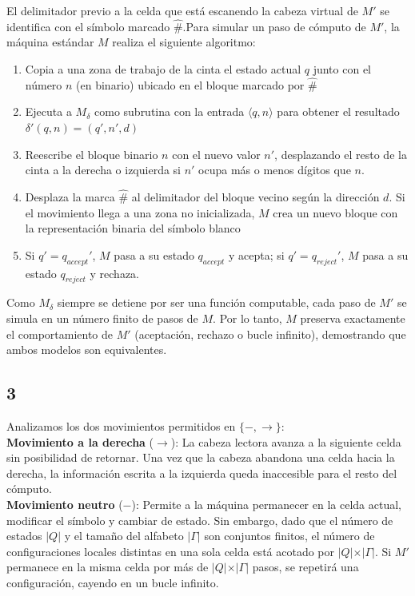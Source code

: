 El delimitador previo a la celda que está escanendo la cabeza virtual de $M'$ se identifica con el símbolo marcado $\hat{\#}$.Para simular un paso de cómputo de $M'$, la máquina estándar $M$ realiza el siguiente algoritmo:

\begin{enumerate}
\item Copia a una zona de trabajo de la cinta el estado actual $q$ junto con el número $n$ (en binario) ubicado en el bloque marcado por $\hat{\#}$
\item Ejecuta a $M_\delta$ como subrutina con la entrada $\langle q, n \rangle$ para obtener el resultado $\delta'(q, n) = (q', n', d)$
\item Reescribe el bloque binario $n$ con el nuevo valor $n'$, desplazando el resto de la cinta a la derecha o izquierda si $n'$ ocupa más o menos dígitos que $n$.\item Desplaza la marca $\hat{\#}$ al delimitador del bloque vecino según la dirección $d$. Si el movimiento llega a una zona no inicializada, $M$ crea un nuevo bloque con la representación binaria del símbolo blanco
\item Si $q' = q_{accept}'$, $M$ pasa a su estado $q_{accept}$ y acepta; si $q' = q_{reject}'$, $M$ pasa a su estado $q_{reject}$ y rechaza.\end{enumerate}

Como $M_\delta$ siempre se detiene por ser una función computable, cada paso de $M'$ se simula en un número finito de pasos de $M$. Por lo tanto, $M$ preserva exactamente el comportamiento de $M'$ (aceptación, rechazo o bucle infinito), demostrando que ambos modelos son equivalentes.


\subsection*{3}

Analizamos los dos movimientos permitidos en $\{- , \rightarrow\}$:\\

\textbf{Movimiento a la derecha} ($\rightarrow$): La cabeza lectora avanza a la siguiente celda sin posibilidad de retornar. Una vez que la cabeza abandona una celda hacia la derecha, la información escrita a la izquierda queda inaccesible para el resto del cómputo.\\

\textbf{Movimiento neutro} ($-$): Permite a la máquina permanecer en la celda actual, modificar el símbolo y cambiar de estado. Sin embargo, dado que el número de estados $\vert{}Q\vert{}$ y el tamaño del alfabeto $\vert{}\Gamma\vert{}$ son conjuntos finitos, el número de configuraciones locales distintas en una sola celda está acotado por $\vert{}Q\vert{} \times \vert{}\Gamma\vert{}$. Si $M'$ permanece en la misma celda por más de $\vert{}Q\vert{} \times \vert{}\Gamma\vert{}$ pasos, se repetirá una configuración, cayendo en un bucle infinito. \\

